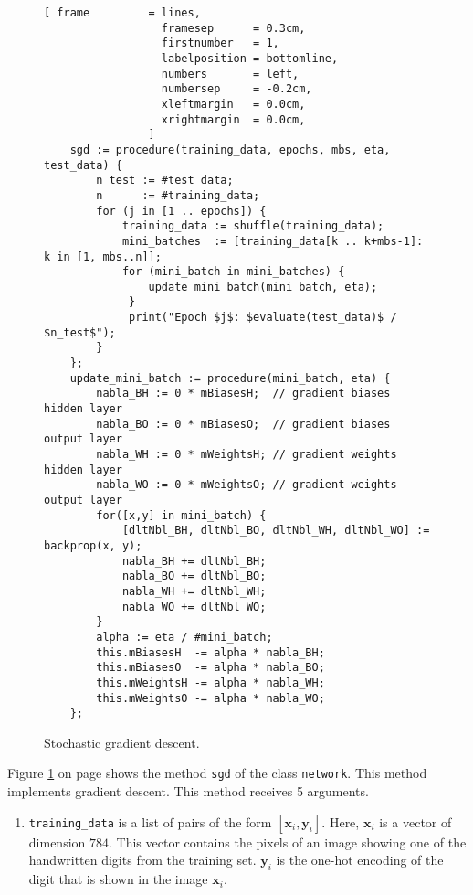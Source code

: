 \begin{figure}[!ht]
\centering
\begin{Verbatim}[ frame         = lines, 
                  framesep      = 0.3cm, 
                  firstnumber   = 1,
                  labelposition = bottomline,
                  numbers       = left,
                  numbersep     = -0.2cm,
                  xleftmargin   = 0.0cm,
                  xrightmargin  = 0.0cm,
                ]
    sgd := procedure(training_data, epochs, mbs, eta, test_data) {
        n_test := #test_data;         
        n      := #training_data;
        for (j in [1 .. epochs]) {
            training_data := shuffle(training_data);
            mini_batches  := [training_data[k .. k+mbs-1]: k in [1, mbs..n]];
            for (mini_batch in mini_batches) {
                update_mini_batch(mini_batch, eta);
             }
             print("Epoch $j$: $evaluate(test_data)$ / $n_test$");
        }
    };
    update_mini_batch := procedure(mini_batch, eta) {
        nabla_BH := 0 * mBiasesH;  // gradient biases hidden layer
        nabla_BO := 0 * mBiasesO;  // gradient biases output layer
        nabla_WH := 0 * mWeightsH; // gradient weights hidden layer
        nabla_WO := 0 * mWeightsO; // gradient weights output layer
        for([x,y] in mini_batch) {
            [dltNbl_BH, dltNbl_BO, dltNbl_WH, dltNbl_WO] := backprop(x, y);
            nabla_BH += dltNbl_BH;
            nabla_BO += dltNbl_BO;
            nabla_WH += dltNbl_WH;
            nabla_WO += dltNbl_WO;
        }        
        alpha := eta / #mini_batch;
        this.mBiasesH  -= alpha * nabla_BH;
        this.mBiasesO  -= alpha * nabla_BO;
        this.mWeightsH -= alpha * nabla_WH;
        this.mWeightsO -= alpha * nabla_WO;
    };
\end{Verbatim}
\vspace*{-0.3cm}
\caption{Stochastic gradient descent.}
\label{fig:nn.stlx:sgd}
\end{figure}
Figure \ref{fig:nn.stlx:sgd} on page \pageref{fig:nn.stlx:sgd} shows the method \texttt{sgd} of the class
\texttt{network}.  This method implements gradient descent.  This method receives 5 arguments.
\begin{enumerate}
\item \texttt{training\_data} is a list of pairs of the form $[\mathbf{x}_i, \mathbf{y}_i]$.
      Here, $\mathbf{x}_i$ is a vector of dimension $784$.  This vector contains the pixels of an image showing
      one of the handwritten digits from the training set.  $\mathbf{y}_i$ is the one-hot encoding of the digit
      that is shown in the image $\mathbf{x}_i$.
\end{enumerate}




